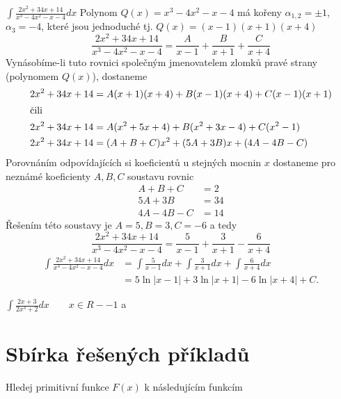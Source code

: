       \begin{example}
        $\displaystyle\int{\frac{2x^2+34x+14}{x^3-4x^2-x-4}}dx$\cite[s.~90]{Knichal}\newline
        Polynom $Q(x)=x^3-4x^2-x-4$ má kořeny $\alpha_{1,2}=\pm1$, $\alpha_{3}=-4$, které jsou
        jednoduché tj. $Q(x)=(x-1)(x+1)(x+4)$ $$\frac{2x^2+34x+14}{x^3-4x^2-x-4} =
        \frac{A}{x-1}+\frac{B}{x+1}+\frac{C}{x+4}$$ Vynásobíme-li tuto rovnici společným
        jmenovatelem zlomků pravé strany (polynomem $Q(x)$), dostaneme
        \begin{align*}
          2x^2+34x+14 &= A(x+1)(x+4)+B(x-1)(x+4)+C(x-1)(x+1) \\
          \intertext{čili}
          2x^2+34x+14 &= A(x^2+5x+4)+B(x^2+3x-4)+C(x^2-1) \\
          2x^2+34x+14 &= (A+B+C)x^2+(5A+3B)x + (4A-4B-C)
        \end{align*}
        Porovnáním odpovídajících si koeficientů u stejných mocnin $x$  dostaneme pro nez\-ná\-mé
        koeficienty $A, B, C$ soustavu rovnic
        \begin{align*}
           A+   B + C &= 2 \\
          5A + 3B     &= 34 \\
          4A - 4B - C &= 14
        \end{align*}
        Řešením této soustavy je $A = 5, B = 3, C = -6$ a tedy
        $$\frac{2x^2+34x+14}{x^3-4x^2-x-4} = \frac{5}{x-1}+\frac{3}{x+1}-\frac{6}{x+4}$$
        \begin{align*}
          \int{\frac{2x^2+34x+14}{x^3-4x^2-x-4}}dx 
            &= \int{\frac{5}{x-1}}dx + \int{\frac{3}{x+1}}dx + \int{\frac{6}{x+4}}dx            \\
            &= 5\ln|x-1| +  3\ln|x+1| - 6\ln|x+4| +C.
        \end{align*}
      \end{example}
  
      \begin{example}$\displaystyle{\int\frac{2x+3}{2x^3+2}dx} \qquad x\in R-{-1}$\newline
        a
      \end{example}

  \newpage
  \section{Sbírka řešených příkladů}
    Hledej primitivní funkce \(F(x)\) k následujícím funkcím
    
    
  \printbibliography[heading=subbibliography]
